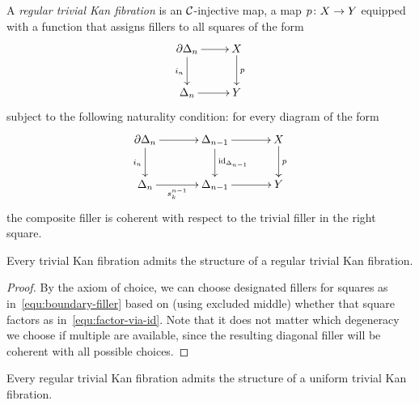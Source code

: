 \documentclass[reqno,10pt,a4paper,oneside]{amsart}
\begin{document}
\begin{definition} A \emph{regular trivial Kan fibration} is an $\cal{C}$-injective map, \ie a map $p \co X \to Y$ 
equipped with a function that assigns fillers to all squares of the form
\begin{equation}
\label{equ:boundary-filler}
\xycenter{
\partial \Delta_n \ar[d]_{i_n} \ar[r] & X \ar[d]^{p} \\
\Delta_n \ar[r] & Y } 
\end{equation}
subject to the following naturality condition: for every diagram of the form
\begin{equation}
\label{equ:factor-via-id}
{\vcenter{\hbox{\xymatrix@C=1.2cm{
  \partial \Delta_n
  \ar[r]
  \ar[d]_{i_n}
&
  \Delta_{n-1}
  \ar[r]
  \ar[d]^{\id_{\Delta_{n-1}}}
&
  X
  \ar[d]^{p}
\\
  \Delta_n
  \ar[r]_-{s_k^{n-1}}
&
  \Delta_{n-1}
  \ar[r]
&
  Y
}}}}
\end{equation}
the composite filler is coherent with respect to the trivial filler in the right square. 
\end{definition}


\begin{lemma}[ZFC] \label{triv-Kan-is-regular}
Every trivial Kan fibration admits the structure of a regular trivial Kan fibration.
\end{lemma}

\begin{proof} By the axiom of choice, we can choose  designated fillers for squares as in~\eqref{equ:boundary-filler}
 based on (using excluded middle) whether that square factors as in~\eqref{equ:factor-via-id}. Note that it does not matter which degeneracy we choose if multiple are available, since the resulting diagonal filler will be coherent with 
 all possible choices.
\end{proof} 


\begin{lemma} \label{reg-triv-is-unif-Kan}
Every regular trivial Kan fibration admits the structure of a uniform trivial Kan fibration.
\end{lemma}
\end{document}
